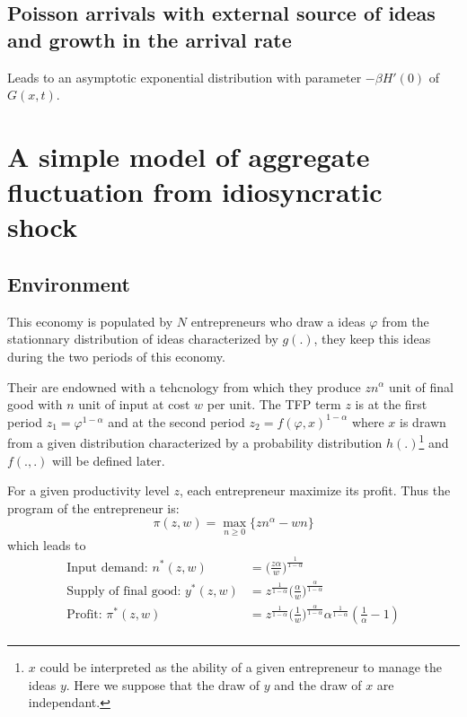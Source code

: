 \documentclass[12pt]{article}
\begin{document}
\subsection{Poisson arrivals with external source of ideas and growth in the arrival rate}

Leads to an asymptotic exponential distribution with parameter $-\beta H'(0)$ of $G(x,t)$. 

\section{A simple model of aggregate fluctuation from idiosyncratic shock}

\subsection{Environment}
This economy is populated by $N$ entrepreneurs who draw a ideas $\varphi$ from the stationnary distribution of ideas characterized by $g(.)$, they keep this ideas during the two periods of this economy.

Their are endowned with a tehcnology from which they produce $z n^{\alpha} $ unit of final good with $n$ unit of input at cost $w$ per unit. The TFP term $z$ is at the first period $z_1=\varphi^{1-\alpha}$ and at the second period $z_2 = f(\varphi, x)^{1-\alpha}$ where $x$ is drawn from a given distribution characterized by a probability distribution $h(.)$\footnote{$x$ could be interpreted as the ability of a given entrepreneur to manage the ideas $y$. Here we suppose that the draw of $y$ and the draw of $x$ are independant.} and $f(.,.)$ will be defined later.

For a given productivity level $z$, each entrepreneur maximize its profit. Thus the program of the entrepreneur is:
\begin{equation*}
\pi (z,w) = \max_{n\geq 0} \{ z n^{\alpha} - w n\} 
\end{equation*}
which leads to 
\begin{align*}
\text{Input demand:   }  n^*(z,w) &=  \Big( \frac{z \alpha}{w} \Big)^{\frac{1}{1-\alpha}}  \\
\text{Supply of final good:   }y^*(z,w) &= z^{\frac{1}{1-\alpha}} \big( \frac{\alpha}{w} \big)^{\frac{\alpha}{1-\alpha}}\\
\text{Profit:   }\pi^*(z,w) &= z^{\frac{1}{1-\alpha}} \big( \frac{1}{w} \big)^{\frac{\alpha}{1-\alpha}} \alpha^{\frac{1}{1-\alpha}} (\frac{1}{\alpha}-1)\\
\end{align*}
\end{document}
